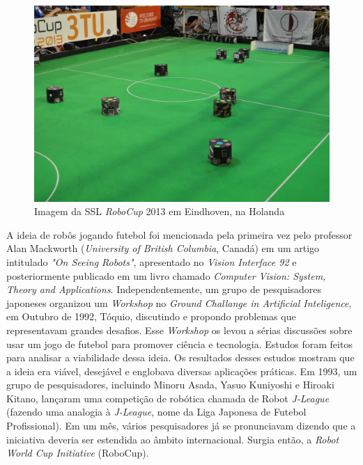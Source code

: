\begin{figure}
  \includegraphics[width = \linewidth]{figuras/robocup2013}
  \caption{Imagem da SSL \textit{RoboCup} 2013 em Eindhoven, na Holanda}\label{fig:robocup2013}
\end{figure}

A ideia de robôs jogando futebol foi mencionada pela primeira vez pelo professor
Alan Mackworth (\textit{University of British Columbia}, Canadá) em um artigo intitulado
\textit{"On Seeing Robots"}, apresentado no \textit{Vision Interface 92} e posteriormente publicado em
um livro chamado \textit{Computer Vision: System, Theory and Applications}. Independentemente,
um grupo de pesquisadores japoneses organizou um \textit{Workshop} no \textit{Ground Challange
in Artificial Inteligence}, em Outubro de 1992, Tóquio, discutindo e propondo problemas que
representavam grandes desafios. Esse \textit{Workshop} os levou a sérias discussões sobre
usar um jogo de futebol para promover ciência e tecnologia. Estudos foram feitos para
analisar a viabilidade dessa ideia. Os resultados desses estudos mostram que
a ideia era viável, desejável e englobava diversas aplicações práticas. Em 1993, um
grupo de pesquisadores, incluindo Minoru Asada, Yasuo Kuniyoshi e Hiroaki Kitano,
lançaram uma competição de robótica chamada de Robot \textit{J-League} (fazendo uma analogia à
\textit{J-League}, nome da Liga Japonesa de Futebol Profissional). Em um mês, vários
pesquisadores já se pronunciavam dizendo que a iniciativa deveria ser estendida ao
âmbito internacional. Surgia então, a \textit{Robot World Cup Initiative} (RoboCup).

